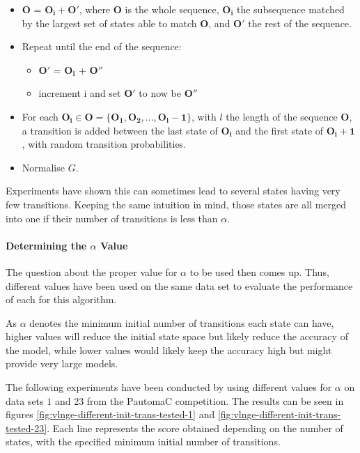 \begin{itemize}
	\item $\mathbf{O}$ = $\mathbf{O_i} + \mathbf{O'}$, where $\mathbf{O}$ is the whole sequence, $\mathbf{O_i}$ the subsequence matched by the largest set of states able to match $\mathbf{O}$, and $\mathbf{O'}$ the rest of the sequence.
	\item Repeat until the end of the sequence:
	\begin{itemize}
		\item $\mathbf{O'}$ = $\mathbf{O_i}$ + $\mathbf{O''}$
		\item increment i and set $\mathbf{O'}$ to now be $\mathbf{O''}$
	\end{itemize}
	\item For each $\mathbf{O_i} \in \mathbf{O} = \{\mathbf{O_1}, \mathbf{O_2}, ... , \mathbf{O_l-1}\}$, with $l$ the length of the sequence $\mathbf{O}$, a transition is added between the last state of $\mathbf{O_i}$ and the first state of $\mathbf{O_i+1}$, with random transition probabilities.
	\item Normalise $G$.
\end{itemize}

Experiments have shown this can sometimes lead to several states having very few transitions. Keeping the same intuition in mind, those states are all merged into one if their number of transitions is less than $\alpha$.

\paragraph{Determining the $\alpha$ Value}

The question about the proper value for $\alpha$ to be used then comes up. Thus, different values have been used on the same data set to evaluate the performance of each for this algorithm.

As $\alpha$ denotes the minimum initial number of transitions each state can have, higher values will reduce the initial state space but likely reduce the accuracy of the model, while lower values would likely keep the accuracy high but might provide very large models.

The following experiments have been conducted by using different values for $\alpha$ on data sets $1$ and $23$ from the PautomaC competition. The results can be seen in figures \ref{fig:vlnge-different-init-trans-tested-1} and \ref{fig:vlnge-different-init-trans-tested-23}. Each line represents the score obtained depending on the number of states, with the specified minimum initial number of transitions.


